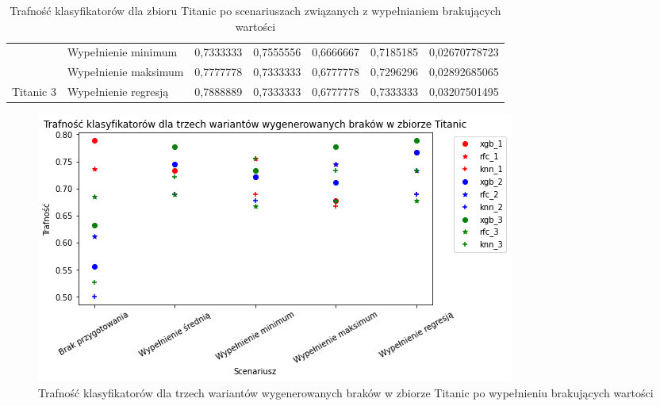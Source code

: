 \documentclass{book}
\begin{document}
\begin{table}[H]
\begin{tabular}{|l|l|r|r|r|r|r|}
                                & Wypełnienie minimum  & 0,7333333                                                                        & \cellcolor[HTML]{67FD9A}0,7555556                                                        & 0,6666667                                                                                          & 0,7185185                                                                       & 0,02670778723                                                                    \\ \cline{2-7} 
                                & Wypełnienie maksimum & 0,7777778                                                                        & 0,7333333                                                                                & 0,6777778                                                                                          & 0,7296296                                                                       & 0,02892685065                                                                    \\ \cline{2-7} 
    \multirow{-5}{*}{Titanic 3} & Wypełnienie regresją & \cellcolor[HTML]{67FD9A}0,7888889                                                & 0,7333333                                                                                & 0,6777778                                                                                          & 0,7333333                                                                       & 0,03207501495                                                                    \\ \hline
    \end{tabular}
    \caption{Trafność klasyfikatorów dla zbioru Titanic po scenariuszach związanych z wypełnianiem brakujących wartości}
    \end{table}

\begin{figure}[H]
    \centerline{\includegraphics[scale=0.8]{Titanic_Wypełnienie_brakujących}}
    \centering
    \caption{Trafność klasyfikatorów dla trzech wariantów wygenerowanych braków w zbiorze Titanic po wypełnieniu brakujących wartości}
    \end{figure}
\end{document}
